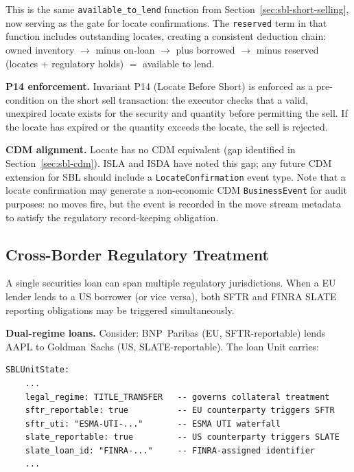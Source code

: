 \documentclass[11pt,a4paper]{article}
\begin{document}
\noindent This is the same \texttt{available\_to\_lend} function from Section~\ref{sec:sbl-short-selling}, now serving as the gate for locate confirmations. The \texttt{reserved} term in that function includes outstanding locates, creating a consistent deduction chain: owned inventory $\to$ minus on-loan $\to$ plus borrowed $\to$ minus reserved (locates + regulatory holds) $=$ available to lend.

\medskip
\noindent\textbf{P14 enforcement.} Invariant P14 (Locate Before Short) is enforced as a pre-condition on the short sell transaction: the executor checks that a valid, unexpired locate exists for the security and quantity before permitting the sell. If the locate has expired or the quantity exceeds the locate, the sell is rejected.

\medskip
\noindent\textbf{CDM alignment.} Locate has no CDM equivalent (gap identified in Section~\ref{sec:sbl-cdm}). ISLA and ISDA have noted this gap; any future CDM extension for SBL should include a \texttt{LocateConfirmation} event type. Note that a locate confirmation may generate a non-economic CDM \texttt{BusinessEvent} for audit purposes: no moves fire, but the event is recorded in the move stream metadata to satisfy the regulatory record-keeping obligation.

\subsection{Cross-Border Regulatory Treatment}
\label{sec:sbl-crossborder}

A single securities loan can span multiple regulatory jurisdictions. When a EU lender lends to a US borrower (or vice versa), both SFTR and FINRA SLATE reporting obligations may be triggered simultaneously.

\medskip
\noindent\textbf{Dual-regime loans.} Consider: BNP~Paribas (EU, SFTR-reportable) lends AAPL to Goldman~Sachs (US, SLATE-reportable). The loan Unit carries:

\begin{lstlisting}
SBLUnitState:
    ...
    legal_regime: TITLE_TRANSFER   -- governs collateral treatment
    sftr_reportable: true          -- EU counterparty triggers SFTR
    sftr_uti: "ESMA-UTI-..."       -- ESMA UTI waterfall
    slate_reportable: true         -- US counterparty triggers SLATE
    slate_loan_id: "FINRA-..."     -- FINRA-assigned identifier
    ...
\end{lstlisting}
\end{document}
